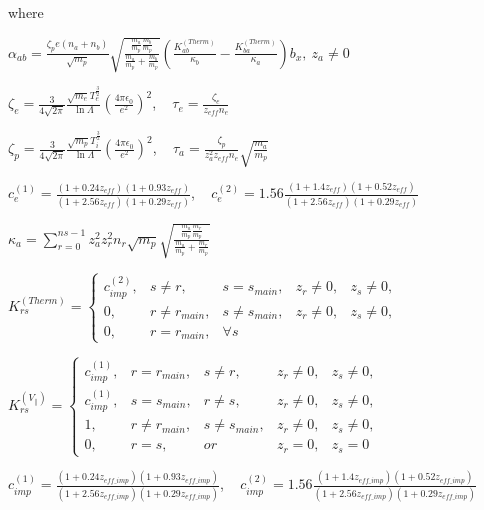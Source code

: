 \documentclass[a4paper,10pt]{report}
\begin{document}
where

$\alpha_{ab} = \frac{\zeta_p e \left( n_a + n_b \right)}{\sqrt{m_p}} \sqrt{\frac{\frac{m_a}{m_p} \frac{m_b}{m_p}}{\frac{m_a}{m_p} + \frac{m_b}{m_p}}} \left( \frac{K_{ab}^{(Therm)}}{\kappa_b} - \frac{K_{ba}^{(Therm)}}{\kappa_a} \right) b_x, ~ z_a \ne 0$

$\zeta_e = \frac{3}{4 \sqrt{2 \pi}} \frac{\sqrt{m_e} T_e^{\frac{3}{2}}}{\ln \Lambda} {\left( \frac{4 \pi \epsilon_0}{e^2} \right)}^2$, ~ $\tau_e = \frac{\zeta_e}{z_{eff} n_e}$

$\zeta_p = \frac{3}{4 \sqrt{2 \pi}} \frac{\sqrt{m_p} T_i^{\frac{3}{2}}}{\ln \Lambda} {\left( \frac{4 \pi \epsilon_0}{e^2} \right)}^2$, ~ $\tau_a = \frac{\zeta_p}{z_a^2 z_{eff} n_e} \sqrt{\frac{m_a}{m_p}}$

$c_e^{(1)} = \frac{\left( 1 + 0.24 z_{eff} \right) \left( 1 + 0.93 z_{eff} \right)}{\left( 1 + 2.56 z_{eff} \right) \left( 1 + 0.29 z_{eff} \right)}$, ~ $c_e^{(2)} = 1.56 \frac{\left( 1 + 1.4 z_{eff} \right) \left( 1 + 0.52 z_{eff} \right)}{\left( 1 + 2.56 z_{eff} \right) \left( 1 + 0.29 z_{eff} \right)}$

$\kappa_a = \sum \limits_{r=0}^{ns - 1} z_a^2 z_r^2 n_r \sqrt{m_p} \sqrt{\frac{\frac{m_a}{m_p} \frac{m_r}{m_p}}{\frac{m_a}{m_p} + \frac{m_r}{m_p}}}$


$K_{rs}^{(Therm)} = \left\{
\begin{matrix}
c_{imp}^{(2)}, & s \ne r, & s = s_{main}, & z_r \ne 0, & z_s \ne 0, \\
0, & r \ne r_{main}, & s \ne s_{main}, & z_r \ne 0, & z_s \ne 0, \\
0, & r = r_{main}, & \forall s & &
\end{matrix}
\right.
$

$K_{rs}^{(V_\parallel)} = \left\{
\begin{matrix}
c_{imp}^{(1)}, & r = r_{main}, & s \ne r, & z_r \ne 0, & z_s \ne 0, \\
c_{imp}^{(1)}, & s = s_{main}, & r \ne s, & z_r \ne 0, & z_s \ne 0, \\
1, & r \ne r_{main}, & s \ne s_{main}, & z_r \ne 0, & z_s \ne 0, \\
0, & r = s, & or & z_r = 0, & z_s = 0
\end{matrix}
\right.
$

$c_{imp}^{(1)} = \frac{\left( 1 + 0.24 z_{eff\_imp} \right) \left( 1 + 0.93 z_{eff\_imp} \right)}{\left( 1 + 2.56 z_{eff\_imp} \right) \left( 1 + 0.29 z_{eff\_imp} \right)}$, ~ $c_{imp}^{(2)} = 1.56 \frac{\left( 1 + 1.4 z_{eff\_imp} \right) \left( 1 + 0.52 z_{eff\_imp} \right)}{\left( 1 + 2.56 z_{eff\_imp} \right) \left( 1 + 0.29 z_{eff\_imp} \right)}$
\end{document}

